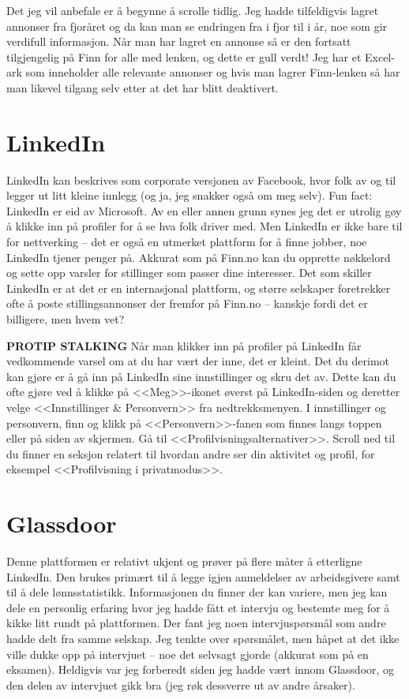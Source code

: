 Det jeg vil anbefale er å begynne å scrolle tidlig. Jeg hadde tilfeldigvis lagret annonser fra fjoråret og da kan man se endringen fra i fjor til i år, noe som gir verdifull informasjon. Når man har lagret en annonse så er den fortsatt tilgjengelig på Finn for alle med lenken, og dette er gull verdt! Jeg har et Excel-ark som inneholder alle relevante annonser og hvis man lagrer Finn-lenken så har man likevel tilgang selv etter at det har blitt deaktivert. 


\section{LinkedIn}

LinkedIn kan beskrives som corporate versjonen av Facebook, hvor folk av og til legger ut litt kleine innlegg (og ja, jeg snakker også om meg selv). Fun fact: LinkedIn er eid av Microsoft. Av en eller annen grunn synes jeg det er utrolig gøy å klikke inn på profiler for å se hva folk driver med. Men LinkedIn er ikke bare til for nettverking – det er også en utmerket plattform for å finne jobber, noe LinkedIn tjener penger på. Akkurat som på Finn.no kan du opprette nøkkelord og sette opp varsler for stillinger som passer dine interesser. Det som skiller LinkedIn er at det er en internasjonal plattform, og større selskaper foretrekker ofte å poste stillingsannonser der fremfor på Finn.no – kanskje fordi det er billigere, men hvem vet?

\begin{remark}
    \textbf{PROTIP STALKING} Når man klikker inn på profiler på LinkedIn får vedkommende varsel om at du har vært der inne, det er kleint. Det du derimot kan gjøre er å gå inn på LinkedIn sine innstillinger og skru det av. Dette kan du ofte gjøre ved å klikke på <<Meg>>-ikonet øverst på LinkedIn-siden og deretter velge <<Innstillinger \& Personvern>> fra nedtrekksmenyen. I innstillinger og personvern, finn og klikk på <<Personvern>>-fanen som finnes langs toppen eller på siden av skjermen. Gå til <<Profilvisningsalternativer>>. Scroll ned til du finner en seksjon relatert til hvordan andre ser din aktivitet og profil, for eksempel <<Profilvisning i privatmodus>>.
\end{remark}


\section{Glassdoor}

Denne plattformen er relativt ukjent og prøver på flere måter å etterligne LinkedIn. Den brukes primært til å legge igjen anmeldelser av arbeidsgivere samt til å dele lønnsstatistikk. Informasjonen du finner der kan variere, men jeg kan dele en personlig erfaring hvor jeg hadde fått et intervju og bestemte meg for å kikke litt rundt på plattformen. Der fant jeg noen intervjuspørsmål som andre hadde delt fra samme selskap. Jeg tenkte over spørsmålet, men håpet at det ikke ville dukke opp på intervjuet – noe det selvsagt gjorde (akkurat som på en eksamen). Heldigvis var jeg forberedt siden jeg hadde vært innom Glassdoor, og den delen av intervjuet gikk bra (jeg røk dessverre ut av andre årsaker).



